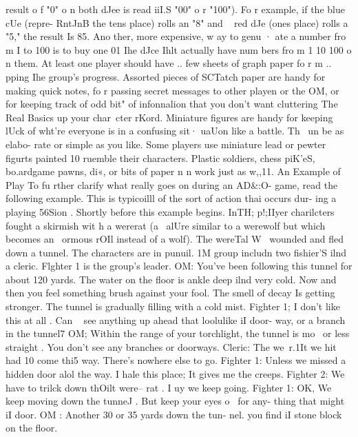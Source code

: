 \documentclass[../main.tex]{subfiles}
\begin{document}
\begin{multicols}{3}
		result o f "0" o n both dJee is read iiI.S "00" o r
		"100"). Fo r example, if the blue cUe (repre-
		RntJnB the tens place) rolls an "8" and ~
		red dJe (ones place) rolls a "5," the result Is
		85. Ano ther, more expensive, w ay to genu ·
		ate a number fro m I to 100 is to buy one 01
		Ihe dJce Ihlt actually have num bers fro m 1
		10 100 o n them.
		At least one player should have .. few
		sheets of graph paper fo r m .. pping Ihe
		group's progress. Assorted pieces of SCTatch
		paper are handy for making quick notes, fo r
		passing secret messages to other playen or
		the OM, or for keeping track of odd bit" of
		infonnalion that you don't want cluttering
		The Real Basics
		up your char~cter rKord.
		Miniature figures are handy for keeping
		lUck of wht're everyone is in a confusing sit·
		uaUon like a battle. Th~ un be as elabo-
		rate or simple as you like. Some players use
		miniature lead or pewter figurts painted 10
		ruemble their characters. Plastic soldiers,
		chess piK'eS, bo.ardgame pawns, di«, or
		bits of paper n n work just as w,,11.
		An Example of Play
		To fu rther clarify
		what really goes on during an AD\&:O-
		game, read the following example. This is
		typicoilll of the sort of action thai occurs dur-
		ing a playing 56Sion .
		Shortly before this example begins. InTH;
		p!;IIyer charilcters fought a skirmish wit h a
		wererat (a ~alUre similar to a werewolf
		but which becomes an ~ormous rOIl instead
		of a wolf). The wereTal W~ wounded and
		fled down a tunnel. The characters are in
		punuil. 1M group includn two fishier'S
		ilnd a cleric. Flghter 1 is the group's leader.
		OM: You've been following this tunnel for
		about 120 yards. The water on the floor
		is ankle deep ilnd very cold. Now and
		then you feel something brush against
		your fool. The smell of decay Is getting
		stronger. The tunnel is gradually filling
		with a cold mist.
		Fighter 1; I don't like this at all . Can ~ see
		anything up ahead that loolulike iI door-
		way, or a branch in the tunnel7
		OM; Within the range of your torchlight,
		the tunnel is mo~ or less straight . You
		don't see any branches or doorways.
		Cleric: The we~r.1It we hit had 10 come thi5
		way. There's nowhere else to go.
		Fighter 1: Unless we missed a hidden door
		alol\8 the way. I hale this place; It gives
		me the creeps.
		Fighter 2: We have to trilck down thOilt were--
		rat . I uy we keep going.
		Fighter 1: OK, We keep moving down the
		tunneJ . But keep your eyes o~ for any-
		thing that might ~ iI door.
		OM : Another 30 or 35 yards down the tun-
		nel. you find iI stone block on the floor.

\end{multicols}
\end{document}
